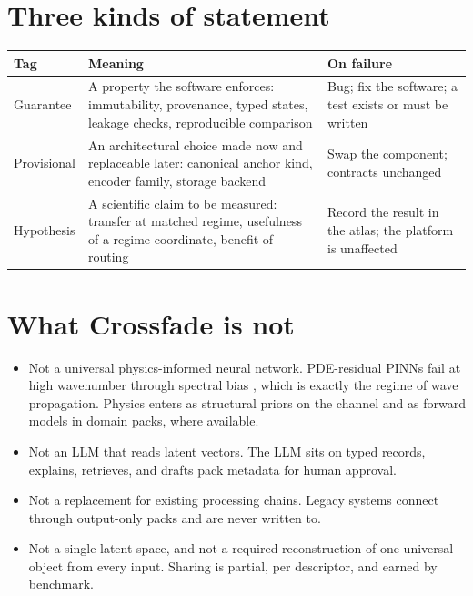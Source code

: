 \documentclass[11pt,a4paper]{article}
\begin{document}
\section{Three kinds of statement}

\begin{center}\small
\begin{tabular}{@{}p{2.6cm}p{7cm}p{5cm}@{}}
\toprule
Tag & Meaning & On failure \\
\midrule
\tagG{} Guarantee & A property the software enforces: immutability, provenance, typed states, leakage checks, reproducible comparison & Bug; fix the software; a test exists or must be written \\
\tagP{} Provisional & An architectural choice made now and replaceable later: canonical anchor kind, encoder family, storage backend & Swap the component; contracts unchanged \\
\tagH{} Hypothesis & A scientific claim to be measured: transfer at matched regime, usefulness of a regime coordinate, benefit of routing & Record the result in the atlas; the platform is unaffected \\
\bottomrule
\end{tabular}
\end{center}

\section{What Crossfade is not}

\begin{itemize}
\item Not a universal physics-informed neural network. PDE-residual PINNs fail at high wavenumber through spectral bias \citep{krishnapriyan2021}, which is exactly the regime of wave propagation. Physics enters as structural priors on the channel and as forward models in domain packs, where available.
\item Not an LLM that reads latent vectors. The LLM sits on typed records, explains, retrieves, and drafts pack metadata for human approval.
\item Not a replacement for existing processing chains. Legacy systems connect through output-only packs and are never written to.
\item Not a single latent space, and not a required reconstruction of one universal object from every input. Sharing is partial, per descriptor, and earned by benchmark.
\end{itemize}
\end{document}
